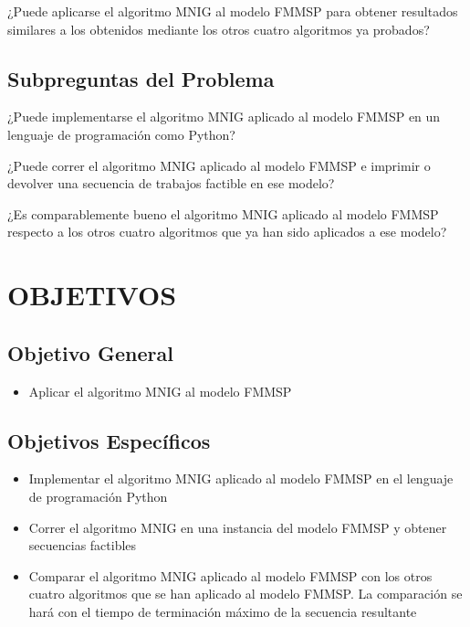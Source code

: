 \documentclass{article}
\begin{document}
¿Puede aplicarse el algoritmo MNIG al modelo FMMSP para obtener resultados
similares a los obtenidos mediante los otros cuatro algoritmos ya probados?

\subsection{Subpreguntas del Problema}

\indent\indent
¿Puede implementarse el algoritmo MNIG aplicado al modelo FMMSP en un lenguaje
de programación como Python?

¿Puede correr el algoritmo MNIG aplicado al modelo FMMSP e imprimir o devolver
una secuencia de trabajos factible en ese modelo?

¿Es comparablemente bueno el algoritmo MNIG aplicado al modelo FMMSP respecto
a los otros cuatro algoritmos que ya han sido aplicados a ese modelo?

\section{OBJETIVOS}

\subsection{Objetivo General}

\begin{itemize}
    \item Aplicar el algoritmo MNIG al modelo FMMSP
\end{itemize}

\subsection{Objetivos Específicos}

\begin{itemize}
    \item Implementar el algoritmo MNIG aplicado al modelo FMMSP en el
    \linebreak lenguaje de programación Python
    \item Correr el algoritmo MNIG en una instancia del modelo FMMSP y
    obtener secuencias factibles
    \item Comparar el algoritmo MNIG aplicado al modelo FMMSP con los otros
    cuatro algoritmos que se han aplicado al modelo FMMSP. La comparación se
    hará con el tiempo de terminación máximo de la secuencia resultante
\end{itemize}
\end{document}

